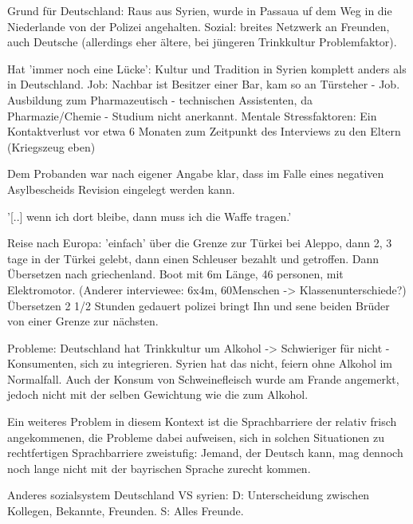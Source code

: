 Grund für Deutschland: Raus aus Syrien, wurde in Passaua uf dem Weg in die Niederlande von der Polizei angehalten.
Sozial: breites Netzwerk an Freunden, auch Deutsche (allerdings eher ältere, bei jüngeren Trinkkultur Problemfaktor).

Hat 'immer noch eine Lücke': Kultur und Tradition in Syrien komplett anders als in Deutschland.
Job: Nachbar ist Besitzer einer Bar, kam so an Türsteher - Job.
Ausbildung zum Pharmazeutisch - technischen Assistenten, da Pharmazie/Chemie - Studium nicht anerkannt.
Mentale Stressfaktoren:
Ein Kontaktverlust vor etwa 6 Monaten zum Zeitpunkt des Interviews zu den Eltern (Kriegszeug eben)

Dem Probanden war nach eigener Angabe klar, dass im Falle eines negativen Asylbescheids Revision eingelegt werden kann.

'[..] wenn ich dort bleibe, dann muss ich die Waffe tragen.'

Reise nach Europa: 'einfach' über die Grenze zur Türkei bei Aleppo, dann 2, 3 tage in der Türkei gelebt, dann einen Schleuser bezahlt und getroffen. Dann Übersetzen nach griechenland. Boot mit 6m Länge, 46 personen, mit Elektromotor. (Anderer interviewee: 6x4m, 60Menschen -> Klassenunterschiede?)
Übersetzen 2 1/2 Stunden gedauert
polizei bringt Ihn und sene beiden Brüder von einer Grenze zur nächsten. 


Probleme: 
    Deutschland hat Trinkkultur um Alkohol -> Schwieriger für nicht - Konsumenten, sich zu integrieren. Syrien hat das nicht, feiern ohne Alkohol im Normalfall.
    Auch der Konsum von Schweinefleisch wurde am Frande angemerkt, jedoch nicht mit der selben Gewichtung wie die zum Alkohol.
    
    Ein weiteres Problem in diesem Kontext ist die Sprachbarriere der relativ frisch angekommenen, die Probleme dabei aufweisen, sich in solchen Situationen zu rechtfertigen
    Sprachbarriere zweistufig: Jemand, der Deutsch kann, mag dennoch noch lange nicht mit der bayrischen Sprache zurecht kommen.
    
    Anderes sozialsystem Deutschland VS syrien: 
        D: Unterscheidung zwischen Kollegen, Bekannte, Freunden.
        S: Alles Freunde.
        
